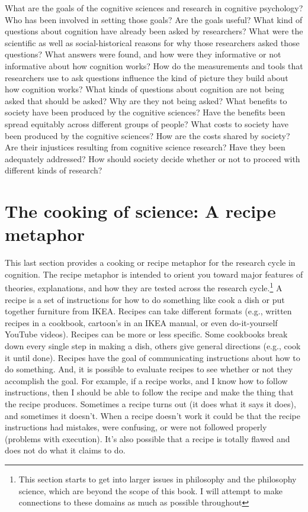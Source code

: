 \documentclass[
  oneside,
  12pt]{crumpbook}
\begin{document}
What are the goals of the cognitive sciences and research in cognitive psychology? Who has been involved in setting those goals? Are the goals useful? What kind of questions about cognition have already been asked by researchers? What were the scientific as well as social-historical reasons for why those researchers asked those questions? What answers were found, and how were they informative or not informative about how cognition works? How do the measurements and tools that researchers use to ask questions influence the kind of picture they build about how cognition works? What kinds of questions about cognition are not being asked that should be asked? Why are they not being asked? What benefits to society have been produced by the cognitive sciences? Have the benefits been spread equitably across different groups of people? What costs to society have been produced by the cognitive sciences? How are the costs shared by society? Are their injustices resulting from cognitive science research? Have they been adequately addressed? How should society decide whether or not to proceed with different kinds of research?

\hypertarget{the-cooking-of-science-a-recipe-metaphor}{%
\section{The cooking of science: A recipe metaphor}\label{the-cooking-of-science-a-recipe-metaphor}}

This last section provides a cooking or recipe metaphor for the research cycle in cognition. The recipe metaphor is intended to orient you toward major features of theories, explanations, and how they are tested across the research cycle.\footnote{This section starts to get into larger issues in philosophy and the philosophy science, which are beyond the scope of this book. I will attempt to make connections to these domains as much as possible throughout} A recipe is a set of instructions for how to do something like cook a dish or put together furniture from IKEA. Recipes can take different formats (e.g., written recipes in a cookbook, cartoon's in an IKEA manual, or even do-it-yourself YouTube videos). Recipes can be more or less specific. Some cookbooks break down every single step in making a dish, others give general directions (e.g., cook it until done). Recipes have the goal of communicating instructions about how to do something. And, it is possible to evaluate recipes to see whether or not they accomplish the goal. For example, if a recipe works, and I know how to follow instructions, then I should be able to follow the recipe and make the thing that the recipe produces. Sometimes a recipe turns out (it does what it says it does), and sometimes it doesn't. When a recipe doesn't work it could be that the recipe instructions had mistakes, were confusing, or were not followed properly (problems with execution). It's also possible that a recipe is totally flawed and does not do what it claims to do.
\end{document}
